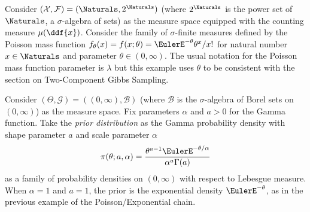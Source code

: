 \documentclass[12pt]{article}
\begin{document}
Consider \( (\mathcal{X}, \mathcal{F}) = (\Naturals, 2^{\Naturals}) \) (where
\( 2^{\Naturals} \) is the power set of \( \Naturals \), a \( \sigma \)-algebra
of sets) as the measure space equipped with the counting measure \( \mu(\ddf
{x}) \).  Consider the family of \( \sigma \)-finite measures defined by
the Poisson mass function \( f_{\theta}(x) = f(x; \theta) = \EulerE^{-\theta}
\theta^x/x! \) for natural number \( x \in \Naturals \) and parameter \(
\theta \in (0, \infty) \).  The usual notation for the Poisson mass
function parameter is \( \lambda \) but this example uses \( \theta \)
to be consistent with the section on Two-Component Gibbs Sampling.

Consider \( (\Theta, \mathcal{G}) = ((0,\infty), \mathcal{B}) \) (where \(
\mathcal{B} \) is the \( \sigma \)-algebra of Borel sets on \( (0,
\infty) \)) as the measure space.  Fix parameters \( \alpha \) and \( a
> 0 \) for the Gamma function.  Take the \emph{prior distribution} as
the Gamma probability density with shape parameter \( a \) and scale
parameter \( \alpha \)
\[
    \pi(\theta; a, \alpha) = \frac{ \theta^{a-1} \EulerE^{-\theta/\alpha}}
    {\alpha^a \Gamma(a)}
\] as a family of probability densities on \( (0,\infty) \) with respect
to Lebesgue measure.  When \( \alpha = 1 \) and \( a = 1 \), the prior
is the exponential density \( \EulerE^{-\theta} \), as in the previous
example of the Poisson/Exponential chain.
\end{document}
